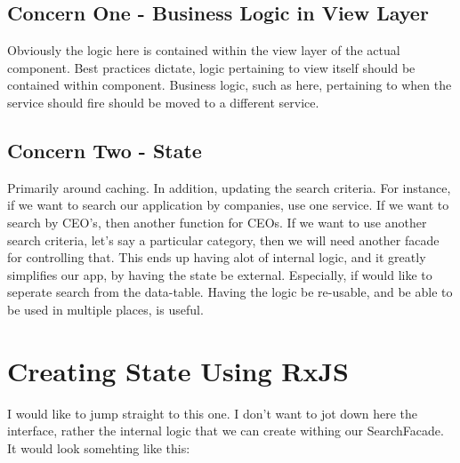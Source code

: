 \subsection{Concern One - Business Logic in View Layer}
Obviously the logic here is contained within the view layer of the actual component. Best practices dictate, logic pertaining to view itself should be contained within component. Business logic, such as here, pertaining to when the service should fire should be moved to a different service. 

\subsection{Concern Two - State }
Primarily around caching. In addition, updating the search criteria. For instance, if we want to search our application by companies, use one service. If we want to search by CEO's, then another function for CEOs. If we want to use another search criteria, let's say a particular category, then we will need another facade for controlling that. This ends up having alot of internal logic, and it greatly simplifies our app, by having the state be external. Especially, if would like to seperate search from the data-table. Having the logic be re-usable, and be able to be used in multiple places, is useful.

\section{Creating State Using RxJS}
I would like to jump straight to this one. I don't want to jot down here the interface, rather the internal logic that we can create withing our SearchFacade. It would look somehting like this:  

